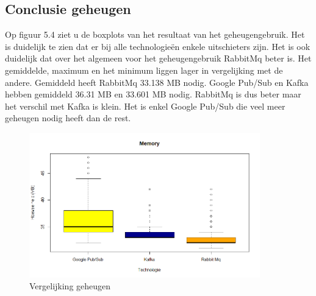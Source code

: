 \subsection{Conclusie geheugen}

Op figuur 5.4 ziet u de boxplots van het resultaat van het geheugengebruik. Het is duidelijk te zien dat er bij alle technologieën enkele uitschieters zijn. Het is ook duidelijk dat over het algemeen voor het geheugengebruik RabbitMq beter is. Het gemiddelde, maximum en het minimum liggen lager in vergelijking met de andere. Gemiddeld heeft RabbitMq 33.138 MB nodig. Google Pub/Sub en Kafka hebben gemiddeld 36.31 MB en 33.601 MB nodig. RabbitMq is dus beter maar het verschil met Kafka is klein. Het is enkel Google Pub/Sub die veel meer geheugen nodig heeft dan de rest.
\begin{figure}[h!]
    \centering
    \includegraphics[width=100mm]{../memory.png}
    \caption{Vergelijking geheugen}
    
\end{figure}


